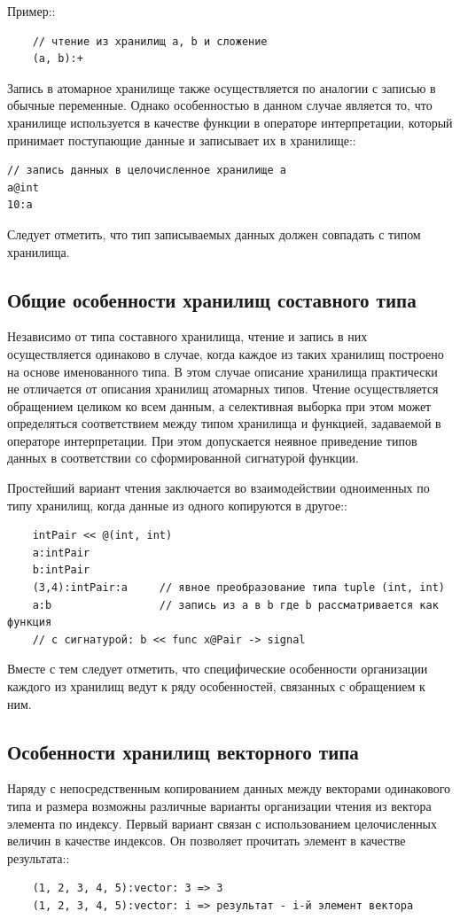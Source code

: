 Пример::
\begin{verbatim}
    // чтение из хранилищ a, b и сложение
    (a, b):+
\end{verbatim}

Запись в атомарное хранилище также осуществляется по аналогии с записью в обычные переменные. Однако особенностью в данном случае является то, что хранилище используется в качестве функции в операторе интерпретации, который принимает поступающие данные и записывает их в хранилище::
\begin{verbatim}
// запись данных в целочисленное хранилище a
a@int
10:a
\end{verbatim}
Следует отметить, что тип записываемых данных должен совпадать с типом хранилища.

\subsection{Общие особенности хранилищ составного типа}

Независимо от типа составного хранилища, чтение и запись в них осуществляется одинаково в случае, когда каждое из таких хранилищ построено на основе именованного типа. В этом случае описание хранилища практически не отличается от описания хранилищ атомарных типов. Чтение осуществляется обращением целиком ко всем данным, а селективная выборка при этом может определяться соответствием между типом хранилища и функцией, задаваемой в операторе интерпретации. При этом допускается неявное приведение типов данных в соответствии со сформированной сигнатурой функции.

Простейший вариант чтения заключается во взаимодействии одноименных по типу хранилищ, когда данные из одного копируются в другое::
\begin{verbatim}
    intPair << @(int, int)
    a:intPair
    b:intPair
    (3,4):intPair:a     // явное преобразование типа tuple (int, int)
    a:b                 // запись из a в b где b рассматривается как функция
    // с сигнатурой: b << func x@Pair -> signal
\end{verbatim}
Вместе с тем следует отметить, что специфические особенности организации каждого из хранилищ ведут к ряду особенностей, связанных с обращением к ним.

\subsection{Особенности хранилищ векторного типа}

Наряду с непосредственным копированием данных между векторами одинакового типа и размера возможны различные варианты организации чтения из вектора элемента по индексу. Первый вариант связан с использованием целочисленных величин в качестве индексов. Он позволяет прочитать элемент в качестве результата::
\begin{verbatim}
    (1, 2, 3, 4, 5):vector: 3 => 3
    (1, 2, 3, 4, 5):vector: i => результат - i-й элемент вектора
\end{verbatim}


